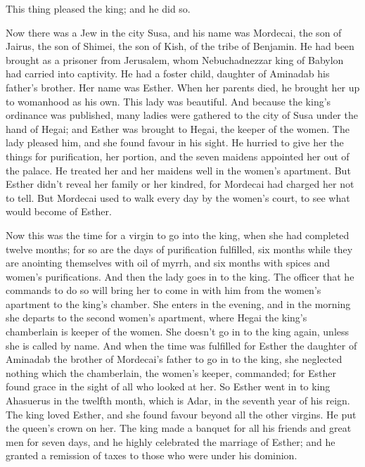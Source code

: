 This thing pleased the king; and he did so.

 Now there was a Jew in the city Susa, and his name was
Mordecai, the son of Jairus, the son of Shimei, the son of Kish, of the
tribe of Benjamin.  He had been brought as a prisoner from
Jerusalem, whom Nebuchadnezzar king of Babylon had carried into
captivity.  He had a foster child, daughter of Aminadab his
father's brother. Her name was Esther. When her parents died, he brought
her up to womanhood as his own. This lady was beautiful. 
And because the king's ordinance was published, many ladies were
gathered to the city of Susa under the hand of Hegai; and Esther was
brought to Hegai, the keeper of the women.  The lady pleased
him, and she found favour in his sight. He hurried to give her the
things for purification, her portion, and the seven maidens appointed
her out of the palace. He treated her and her maidens well in the
women's apartment.  But Esther didn't reveal her family or
her kindred, for Mordecai had charged her not to tell.  But
Mordecai used to walk every day by the women's court, to see what would
become of Esther.

 Now this was the time for a virgin to go into the king,
when she had completed twelve months; for so are the days of
purification fulfilled, six months while they are anointing themselves
with oil of myrrh, and six months with spices and women's purifications.
 And then the lady goes in to the king. The officer that he
commands to do so will bring her to come in with him from the women's
apartment to the king's chamber.  She enters in the
evening, and in the morning she departs to the second women's apartment,
where Hegai the king's chamberlain is keeper of the women. She doesn't
go in to the king again, unless she is called by name.  And
when the time was fulfilled for Esther the daughter of Aminadab the
brother of Mordecai's father to go in to the king, she neglected nothing
which the chamberlain, the women's keeper, commanded; for Esther found
grace in the sight of all who looked at her.  So Esther
went in to king Ahasuerus in the twelfth month, which is Adar, in the
seventh year of his reign.  The king loved Esther, and she
found favour beyond all the other virgins. He put the queen's crown on
her.  The king made a banquet for all his friends and great
men for seven days, and he highly celebrated the marriage of Esther; and
he granted a remission of taxes to those who were under his dominion.

